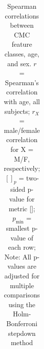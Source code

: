\documentclass{article}
\begin{document}
\begin{table}
\begin{tabular}{llrrrrrrr}
	\bottomrule
\end{tabular}
\footnotesize
\caption{Spearman correlations between CMC feature classes, age, and sex.
$r$ = Spearman's correlation with age, all subjects;
$r_X$ = male/female correlation for X = M/F, respectively;
$[]_p$ = two-sided p-value for metric [];
$p_{\min}$ = smallest p-value of each row;
Note: All p-values are adjusted for multiple comparisons using the Holm-Bonferroni stepdown method
}
\normalsize
\label{tab:cmc-age-spearman}
\end{table}
\end{document}
